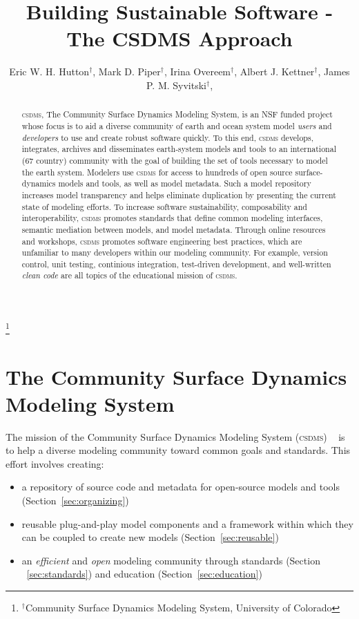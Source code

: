 \documentclass[11pt, oneside]{amsart}
\DeclareRobustCommand{\csdms}{\textsc{csdms}}
\begin{document}
\title[]{Building Sustainable Software - The CSDMS Approach}

\author{
  Eric W. H. Hutton$^{\dag}$,
  Mark D. Piper$^{\dag}$,
  Irina Overeem$^{\dag}$,
  Albert J. Kettner$^{\dag}$,
  James P. M. Syvitski$^{\dag}$,
}

\thanks{{}$^{\dag}$Community Surface Dynamics Modeling System, University of
Colorado}

\begin{abstract}

\csdms{}, The Community Surface Dynamics Modeling System, is an NSF funded
project whose focus is to aid a diverse community of earth and ocean system
model \emph{users} and \emph{developers} to use and create robust software
quickly.  To this end, \csdms{} develops, integrates, archives and disseminates
earth-system models and tools to an international (67 country) community
with the goal of building the set of tools necessary to model the
earth system. Modelers use \csdms{} for access to hundreds of open
source surface-dynamics models and tools, as well as model metadata. Such a
model repository increases model transparency and helps eliminate
duplication by presenting the current state of modeling efforts.
To increase software sustainability, composability and interoperability,
\csdms{} promotes standards that define common modeling interfaces, semantic
mediation between models, and model metadata. Through online resources and
workshops, \csdms{} promotes software engineering best practices, which are
unfamiliar to many developers within our modeling community. For example,
version control, unit testing, continious integration, test-driven
development, and well-written \emph{clean code} are all topics of the
educational mission of \csdms{}.

\end{abstract}

\maketitle

\section{The Community Surface Dynamics Modeling System}

The mission of the Community Surface Dynamics Modeling System (\csdms{})
~\cite{peckham2012component} is to help a diverse modeling community toward
common goals and standards. This effort involves creating:
\begin{itemize}
  \item a repository of source code and metadata for open-source models and
    tools (Section~\ref{sec:organizing})
  \item reusable plug-and-play model components and a framework
        within which they can be coupled to create new models
        (Section~\ref{sec:reusable})
  \item an \emph{efficient} and \emph{open} modeling community through
        standards (Section ~\ref{sec:standards}) and education
        (Section~\ref{sec:education})
\end{itemize}
\end{document}
